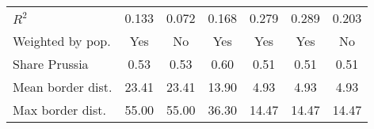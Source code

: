 {\begin{tabular}{l*{6}{c}}
\(R^{2}\)           &       0.133         &       0.072         &       0.168         &       0.279         &       0.289         &       0.203         \\
Weighted by pop.    &         Yes         &          No         &         Yes         &         Yes         &         Yes         &          No         \\
Share Prussia       &        0.53         &        0.53         &        0.60         &        0.51         &        0.51         &        0.51         \\
Mean border dist.   &       23.41         &       23.41         &       13.90         &        4.93         &        4.93         &        4.93         \\
Max border dist.    &       55.00         &       55.00         &       36.30         &       14.47         &       14.47         &       14.47         \\
\hline\hline
\end{tabular}
}
